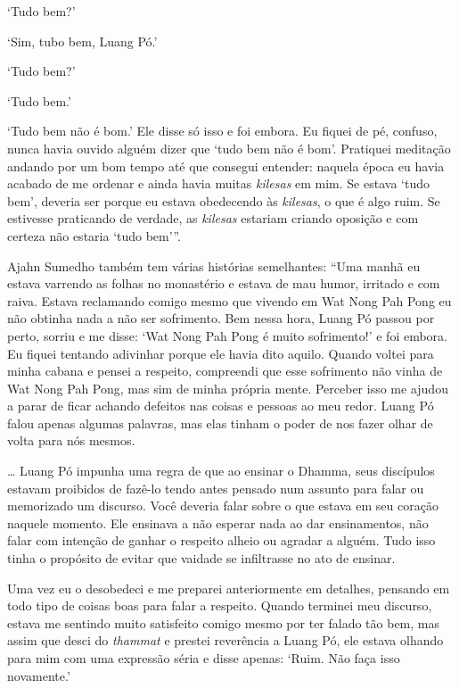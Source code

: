 `Tudo bem?'

`Sim, tubo bem, Luang Pó.'

`Tudo bem?'

`Tudo bem.'

`Tudo bem não é bom.' Ele disse só isso e foi embora. Eu fiquei de pé,
confuso, nunca havia ouvido alguém dizer que `tudo bem não é bom'.
Pratiquei meditação andando por um bom tempo até que consegui entender:
naquela época eu havia acabado de me ordenar e ainda havia muitas
\emph{kilesas} em mim. Se estava `tudo bem', deveria ser porque eu
estava obedecendo às \emph{kilesas}, o que é algo ruim. Se estivesse
praticando de verdade, as \emph{kilesas} estariam criando oposição e com
certeza não estaria `tudo bem'\thinspace ''.

Ajahn Sumedho também tem várias histórias semelhantes: ``Uma manhã eu
estava varrendo as folhas no monastério e estava de mau humor, irritado
e com raiva. Estava reclamando comigo mesmo que vivendo em Wat Nong Pah
Pong eu não obtinha nada a não ser sofrimento. Bem nessa hora, Luang Pó
passou por perto, sorriu e me disse: `Wat Nong Pah Pong é muito
sofrimento!' e foi embora. Eu fiquei tentando adivinhar porque ele havia
dito aquilo. Quando voltei para minha cabana e pensei a respeito,
compreendi que esse sofrimento não vinha de Wat Nong Pah Pong, mas sim
de minha própria mente. Perceber isso me ajudou a parar de ficar achando
defeitos nas coisas e pessoas ao meu redor. Luang Pó falou apenas
algumas palavras, mas elas tinham o poder de nos fazer olhar de volta
para nós mesmos.

\ldots{} Luang Pó impunha uma regra de que ao ensinar o Dhamma, seus
discípulos estavam proibidos de fazê-lo tendo antes pensado num assunto
para falar ou memorizado um discurso. Você deveria falar sobre o que
estava em seu coração naquele momento. Ele ensinava a não esperar nada
ao dar ensinamentos, não falar com intenção de ganhar o respeito alheio
ou agradar a alguém. Tudo isso tinha o propósito de evitar que vaidade
se infiltrasse no ato de ensinar.

Uma vez eu o desobedeci e me preparei anteriormente em detalhes,
pensando em todo tipo de coisas boas para falar a respeito. Quando
terminei meu discurso, estava me sentindo muito satisfeito comigo mesmo
por ter falado tão bem, mas assim que desci do \emph{thammat} e prestei
reverência a Luang Pó, ele estava olhando para mim com uma expressão
séria e disse apenas: `Ruim. Não faça isso novamente.'

